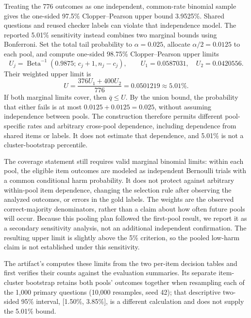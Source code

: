 Treating the 776 outcomes as one independent, common-rate binomial sample gives the one-sided 97.5\% Clopper--Pearson \citep{clopper1934use} upper bound 3.9525\%. Shared questions and reused checker labels can violate that independence model. The reported 5.01\% sensitivity instead combines two marginal bounds using Bonferroni. Set the total tail probability to $\alpha=0.025$, allocate $\alpha/2=0.0125$ to each pool, and compute one-sided 98.75\% Clopper--Pearson upper limits
\[
  U_j=\operatorname{Beta}^{-1}(0.9875;\,c_j+1,n_j-c_j),
  \qquad U_1=0.0587031,\quad U_2=0.0420556.
\]
Their weighted upper limit is
\[
  U=\frac{376U_1+400U_2}{776}=0.0501219\approx5.01\%.
\]
If both marginal limits cover, then $\bar q\leq U$. By the union bound, the probability that either fails is at most $0.0125+0.0125=0.025$, without assuming independence between pools. The construction therefore permits different pool-specific rates and arbitrary cross-pool dependence, including dependence from shared items or labels. It does not estimate that dependence, and 5.01\% is not a cluster-bootstrap percentile.

The coverage statement still requires valid marginal binomial limits: within each pool, the eligible item outcomes are modeled as independent Bernoulli trials with a common conditional harm probability. It does not protect against arbitrary within-pool item dependence, changing the selection rule after observing the analyzed outcomes, or errors in the gold labels. The weights are the observed correct-majority denominators, rather than a claim about how often future pools will occur. Because this pooling plan followed the first-pool result, we report it as a secondary sensitivity analysis, not an additional independent confirmation. The resulting upper limit is slightly above the 5\% criterion, so the pooled low-harm claim is not established under this sensitivity.

The artifact's  computes these limits from the two per-item decision tables and first verifies their counts against the evaluation summaries. Its separate item-cluster bootstrap retains both pools' outcomes together when resampling each of the 1,000 primary questions (10,000 resamples, seed 42); that descriptive two-sided 95\% interval, [1.50\%, 3.85\%], is a different calculation and does not supply the 5.01\% bound.
